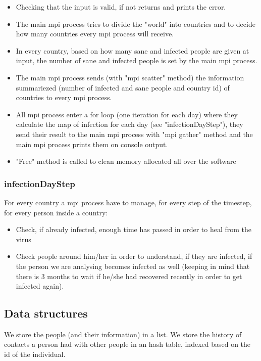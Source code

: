 \documentclass[table, 12pt]{article}
\begin{document}
\begin{itemize}
\setlength\itemsep{-0.5em}
\item Checking that the input is valid, if not returns and prints the error.
\item The main mpi process tries to divide the "world" into countries and to decide how many countries every mpi process will receive.
\item In every country, based on how many sane and infected people are given at input, the number of sane and infected people is set by the main mpi process.
\item The main mpi process sends (with "mpi scatter" method) the information summariezed (number of infected and sane people and country id) of countries to every mpi process.
\item All mpi process enter a for loop (one iteration for each day) where they calculate the map of infection for each day (see "infectionDayStep"), they send their result to the main mpi process with "mpi gather" method and the main mpi process prints them on console output.
\item "Free" method is called to clean memory allocated all over the software
\end{itemize}

\subsubsection{infectionDayStep}

For every country a mpi process have to manage, for every step of the timestep, for every person inside a country:

\begin{itemize}
\setlength\itemsep{-0.5em}
\item Check, if already infected, enough time has passed in order to heal from the virus
\item Check people around him/her in order to understand, if they are infected, if the person we are analysing becomes infected as well (keeping in mind that there is 3 months to wait if he/she had recovered recently in order to get infected again).
\end{itemize}

\subsection{Data structures}
We store the people (and their information) in a list.
We store the history of contacts a person had with other people in an hash table, indexed based on the id of the individual.
\end{document}
